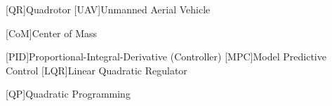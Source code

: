 
\begin{acronym}[\hspace{0.8in}] %


%	

%
%
%	

%	
%	
%
%	
%
%	
%	
%	

	[QR]{Quadrotor}
	[UAV]{Unmanned Aerial Vehicle}

	[CoM]{Center of Mass}
	
	[PID]{Proportional-Integral-Derivative (Controller)}
	[MPC]{Model Predictive Control}
	[LQR]{Linear Quadratic Regulator}
	
	[QP]{Quadratic Programming}


\end{acronym}